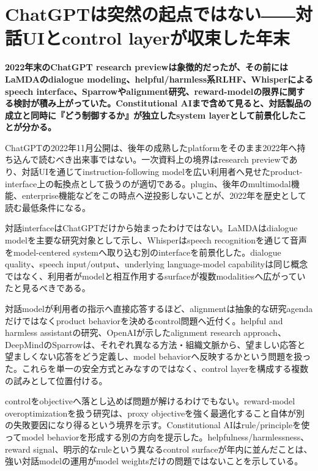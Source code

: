 \section{ChatGPTは突然の起点ではない――対話UIとcontrol layerが収束した年末}
\label{pkg:dialogue-interface-control}
\noindent\textbf{2022年末のChatGPT research previewは象徴的だったが、その前にはLaMDAのdialogue modeling、helpful/harmless系RLHF、Whisperによるspeech interface、Sparrowやalignment研究、reward-modelの限界に関する検討が積み上がっていた。Constitutional AIまで含めて見ると、対話製品の成立と同時に『どう制御するか』が独立したsystem layerとして前景化したことが分かる。}\autocite{src-2a9e3cfb3148,src-2b132b9f05ef,src-7ef567047bd7,src-bc1a61aec959,src-f4ecc26bd1e5}

ChatGPTの2022年11月公開は、後年の成熟したplatformをそのまま2022年へ持ち込んで読むべき出来事ではない。一次資料上の境界はresearch previewであり、対話UIを通じてinstruction-following modelを広い利用者へ見せたproduct-interface上の転換点として扱うのが適切である。plugin、後年のmultimodal機能、enterprise機能などをこの時点へ逆投影しないことが、2022年を歴史として読む最低条件になる。\autocite{src-bc1a61aec959}


対話interfaceはChatGPTだけから始まったわけではない。LaMDAはdialogue modelを主要な研究対象として示し、Whisperはspeech recognitionを通じて音声をmodel-centered systemへ取り込む別のinterfaceを前景化した。dialogue quality、speech input/output、underlying language-model capabilityは同じ概念ではなく、利用者がmodelと相互作用するsurfaceが複数modalitiesへ広がっていたと見るべきである。\autocite{src-2a9e3cfb3148,src-2b132b9f05ef,src-7ef567047bd7}


対話modelが利用者の指示へ直接応答するほど、alignmentは抽象的な研究agendaだけではなくproduct behaviorを決めるcontrol問題へ近付く。helpful and harmless assistantの研究、OpenAIが示したalignment research approach、DeepMindのSparrowは、それぞれ異なる方法・組織文脈から、望ましい応答と望ましくない応答をどう定義し、model behaviorへ反映するかという問題を扱った。これらを単一の安全方式とみなすのではなく、control layerを構成する複数の試みとして位置付ける。\autocite{src-81cf88ab9c36,src-ce2ca3d4fe8f,src-d7f602cae828}


controlをobjectiveへ落とし込めば問題が解けるわけでもない。reward-model overoptimizationを扱う研究は、proxy objectiveを強く最適化すること自体が別の失敗要因になり得るという境界を示す。Constitutional AIはrule/principleを使ってmodel behaviorを形成する別の方向を提示した。helpfulness/harmlessness、reward signal、明示的なruleという異なるcontrol surfaceが年内に並んだことは、強い対話modelの運用がmodel weightsだけの問題ではないことを示している。\autocite{src-1a032a768300,src-83ce66a102c3,src-ce2ca3d4fe8f,src-f4ecc26bd1e5}



